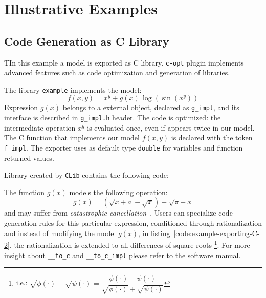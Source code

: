 
\section{Illustrative Examples}
\label{sec:examples}

\subsection{Code Generation as C Library}
TIn this example a model is exported as C library. \texttt{c-opt} plugin implements advanced features such as code optimization and generation of libraries.

The library \texttt{example} implements the model:
\begin{equation}
f(x, y) = x^y + g(x)\, \log(\sin(x^y))
\end{equation}
Expression $g(x)$ belongs to a external object, declared as \texttt{g\_impl}, and its interface is described in \texttt{g\_impl.h} header. The code is optimized: the intermediate operation $x^y$ is evaluated once, even if appears twice in our model. The C function that implements our model $f(x,y)$ is declared with the token \texttt{f\_impl}. The exporter uses as default type \texttt{double} for variables and function returned values.

\noindent%


Library created by \texttt{CLib} contains the following code:

\noindent%
  \begin{minipage}{.5\textwidth}
    
  \end{minipage}\hfill
  \begin{minipage}{.5\textwidth}
    
  \end{minipage}

The function $g(x)$ models the following operation:
\begin{equation}
g(x) = (\sqrt{x + a} - \sqrt{x}) + \sqrt{\pi + x}
\end{equation}
and may suffer from \emph{catastrophic cancellation}~\cite{higham2002accuracy}. Users can specialize code generation rules for this particular expression, conditioned through rationalization and instead of modifying the model $g(x)$, in listing~\ref{code:example-exporting-C-2}, the rationalization is extended to all differences of square roots
\footnote{i.e.:
$\sqrt{\phi(\cdot)} - \sqrt{\psi(\cdot)} =
\dfrac{\phi(\cdot) - \psi(\cdot)}{\sqrt{\phi(\cdot)} + \sqrt{\psi(\cdot)}}$}.
For more insight about \verb!__to_c! and \verb!__to_c_impl! please refer to the software manual.

